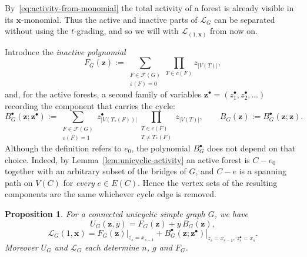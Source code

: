 \documentclass[11pt]{article}
\theoremstyle{plain}
\newtheorem{proposition}[theorem]{Proposition}
\theoremstyle{definition}
\renewcommand{\mathcal}{\mathscr}
\newcommand{\LL}{\mathcal{L}}    %
\newcommand{\cF}{\mathcal{F}}    %
\newcommand{\bx}{\mathbf{x}}
\newcommand{\bz}{\mathbf{z}}
\newcommand{\eps}{\varepsilon}
\numberwithin{equation}{section}
\begin{document}
By~\eqref{eq:activity-from-monomial} the total activity of a forest is already visible in its $\bx$-monomial.
Thus the active and inactive parts of $\LL_G$  can be separated without using the $t$-grading,
and so we will with $\LL_(1,\bx)$ from now on.

Introduce the \emph{inactive polynomial}
\begin{equation}\label{eq:unicyclic-inactive}
   F_G(\bz) := \sum_{\substack{F\in\cF(G)\\ \eps(F)=0}} \prod_{T\in c(F)} z_{|V(T)|},
\end{equation}
and, for the active forests, a second family of variables
$\bz^\bullet=(z_1^\bullet,z_2^\bullet,\ldots)$ recording the component
that carries the cycle:
\begin{equation}\label{eq:unicyclic-pointed}
   B_G^\bullet(\bz;\bz^\bullet) := \sum_{\substack{F\in\cF(G)\\ \eps(F)=1}}
   z^\bullet_{|V(T_*(F))|} \prod_{\substack{T\in c(F)\\T\ne T_*(F)}} z_{|V(T)|},
 \qquad  B_G(\bz):=B_G^\bullet(\bz;\bz).
\end{equation}
Although the definition refers to $e_0$, the polynomial $B_G^\bullet$ does not
depend on that choice.  Indeed, by Lemma~\ref{lem:unicyclic-activity} an
active forest is $C-e_0$ together with an arbitrary subset of the bridges of
$G$, and $C-e$ is a spanning path on $V(C)$ for \emph{every} $e\in E(C)$.
Hence the vertex sets of the resulting components are the same whichever cycle
edge is removed.

\begin{proposition}\label{prop:unicyclic-two-specializations}
For a connected unicyclic simple graph $G$, we have
\begin{equation}\label{eq:unicyclic-U-decomposition}
   U_G(\bz,y)
   =
   F_G(\bz)+y\,B_G(\bz),
\end{equation}
\begin{equation}\label{eq:unicyclic-L-decomposition}
   \LL_G(1,\bx)
   =
   \left.F_G(\bz)\right|_{z_s=x_{s-1}}
   +
   \left.B_G^\bullet(\bz;\bz^\bullet)\right|_{z_s=x_{s-1},\ z_s^\bullet=x_s}.
\end{equation}
Moreover $U_G$ and $\LL_G$ each determine $n$, $g$ and $F_G$.
\end{proposition}
\end{document}
